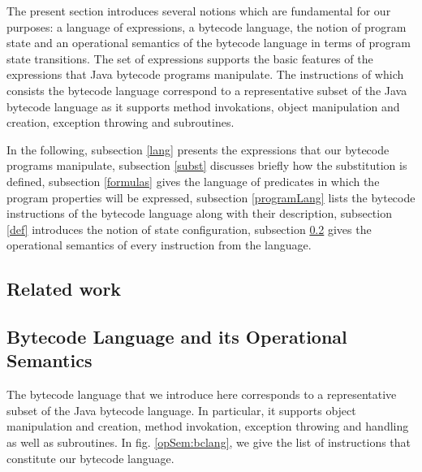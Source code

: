 \newtheorem{StateTransition}{Definition}

 The present section introduces several notions which are fundamental 
 for our purposes: a language of expressions, a bytecode language, the notion of
 program state and an operational semantics of the bytecode language in terms of program state transitions. 
 The set of expressions supports the basic features of the expressions that Java bytecode programs manipulate.
 The instructions of which consists the bytecode language correspond to a representative subset of
 the Java bytecode language as it supports method invokations, object manipulation and creation, 
 exception throwing and subroutines. 
 
 In the following, subsection \ref{lang} presents the expressions that our bytecode programs manipulate, 
 subsection \ref{subst} discusses briefly how the substitution is defined,
 subsection \ref{formulas} gives the language of predicates in which the program properties will be expressed,
 subsection \ref{programLang} lists the bytecode instructions of the bytecode language along with their description,
 subsection \ref{def} introduces the notion of state configuration,
 subsection \ref{opSem} gives the operational semantics of 
 every instruction from the language.






\subsection{Related work}





\subsection{Bytecode Language and its Operational Semantics} \label{opSem}
 The bytecode language that we introduce here corresponds to a representative subset of the Java bytecode language. 
 In particular, it supports object manipulation and creation, method invokation, exception throwing and handling as
 well as subroutines. In fig. \ref{opSem:bclang}, we give the list of instructions that constitute our bytecode
 language.
 
